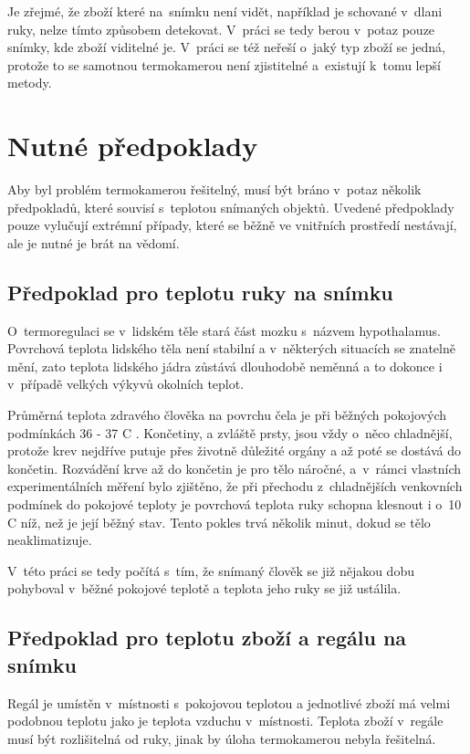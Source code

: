 Je zřejmé, že zboží které na~snímku není vidět, například je schované v~dlani ruky, nelze tímto způsobem detekovat. V~práci se tedy berou v~potaz pouze snímky, kde zboží viditelné je. V~práci se též neřeší o~jaký typ zboží se jedná, protože to se samotnou termokamerou není zjistitelné a~existují k~tomu lepší metody. 

\section{Nutné předpoklady}
Aby byl problém termokamerou řešitelný, musí být bráno v~potaz několik předpokladů, které souvisí s~teplotou snímaných objektů. Uvedené předpoklady pouze vylučují extrémní případy, které se běžně ve vnitřních prostředí nestávají, ale je nutné je brát na vědomí.

	\subsection{Předpoklad pro teplotu ruky na snímku}\label{section:hand_temp_prereq}
	O~termoregulaci se v~lidském těle stará část mozku s~názvem hypothalamus.  Povrchová teplota lidského těla není stabilní a v~některých situacích se znatelně mění, zato teplota lidského jádra zůstává dlouhodobě neměnná a to dokonce i v~případě velkých výkyvů okolních teplot. \cite{pvrikopa2011navrhnvete}
    
    Průměrná teplota zdravého člověka na povrchu čela je při běžných pokojových podmínkách 36 - 37 \textdegree{}C \cite{mlvcak2007mapovani}. Končetiny, a zvláště prsty, jsou vždy o~něco chladnější, protože krev nejdříve putuje přes životně důležité orgány a až poté se dostává do končetin. Rozvádění krve až do končetin je pro tělo náročné, a~v~rámci vlastních experimentálních měření bylo zjištěno, že při přechodu z~chladnějších venkovních podmínek do pokojové teploty je povrchová teplota ruky schopna klesnout i o~10 \textdegree{}C níž, než je její běžný stav. Tento pokles trvá několik minut, dokud se tělo neaklimatizuje.
    
    V~této práci se tedy počítá s~tím, že snímaný člověk se již nějakou dobu pohyboval v~běžné pokojové teplotě a teplota jeho ruky se již ustálila.
    
    \subsection{Předpoklad pro teplotu zboží a regálu na snímku}
    Regál je umístěn v~místnosti s~pokojovou teplotou a jednotlivé zboží má velmi podobnou teplotu jako je teplota vzduchu v~místnosti. Teplota zboží v~regále musí být rozlišitelná od ruky, jinak by úloha termokamerou nebyla řešitelná.
    
